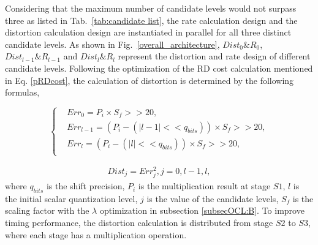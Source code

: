 \documentclass[lettersize,journal]{IEEEtran}
\begin{document}
Considering that the maximum number of candidate levels would not surpass three as listed in Tab.~\ref{tab:candidate list}, the rate calculation design and the distortion calculation design are instantiated in parallel for all three distinct candidate levels. As shown in Fig.~\ref{overall_architecture}, $Dist_{0}\&R_{0}$, $Dist_{l-1}\&R_{l-1}$ and $Dist_{l}\&R_{l}$ represent the distortion and rate design of different candidate levels. 
Following the optimization of the RD cost calculation mentioned in Eq. \ref{pRDcost}, the calculation of distortion is determined by the following formulas,

\begin{equation}\label{err}
	\left\{
		\begin{aligned}
			&Err_{0} 	=  P_{i} \times S_f >> 20,  \\
			&Err_{l-1} 	= \left ( P_{i} - \left ( \lvert l-1 \rvert << q_{bits} \right ) \right ) \times S_f >> 20,  \\
			&Err_{l} 	= \left ( P_{i} - \left ( \lvert l \rvert << q_{bits} \right ) \right ) \times S_f >> 20,  \\ 
		\end{aligned}
	\right.
\end{equation}

\begin{equation}\label{distortion}
	\begin{aligned}
		Dist_{j} = Err_{j}^{2}, j = 0, l-1, l,
	\end{aligned}
\end{equation}
where $q_{bits}$ is the shift precision, $P_{i}$ is the multiplication result at stage $S1$, $l$ is the initial scalar quantization level, $j$ is the value of the candidate levels, $S_f$ is the scaling factor with the $\lambda$ optimization in subsection \ref{subsecOCL:B}. To improve timing performance, the distortion calculation is distributed from stage $S2$ to $S3$, where each stage has a multiplication operation. 
\end{document}
